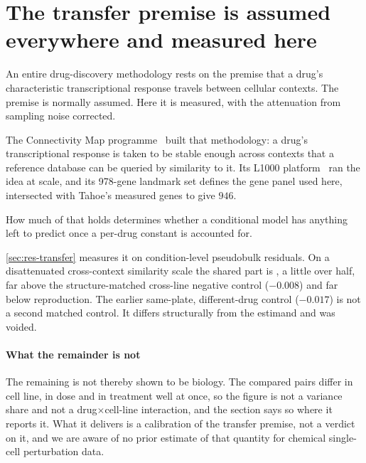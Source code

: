 \section{The transfer premise is assumed everywhere and measured here}
\label{sec:lit-cmap}
\framedecl{-}

\begin{question}
An entire drug-discovery methodology rests on the premise that a drug's
characteristic transcriptional response travels between cellular contexts. The
premise is normally assumed. Here it is measured, with the attenuation from
sampling noise corrected.
\end{question}

\noindent
The Connectivity Map programme~\cite{cmap,l1000} built that methodology: a drug's
transcriptional response is taken to be stable enough across contexts that a
reference database can be queried by similarity to it. Its L1000
platform~\cite{l1000} ran the idea at scale, and its 978-gene landmark set
defines the gene panel used here, intersected with Tahoe's measured genes to give
$946$.

How much of that holds determines whether a conditional model has anything left
to predict once a per-drug constant is accounted for.

\cref{sec:res-transfer} measures it on condition-level pseudobulk residuals. On a
disattenuated cross-context similarity scale the shared part is
, a little over half, far above the
structure-matched cross-line negative control ($-0.008$) and far below
reproduction. The earlier same-plate, different-drug control ($-0.017$) is not a
second matched control. It differs structurally from the estimand and was
voided.

\paragraph{What the remainder is not} The remaining 
is not thereby shown to be biology. The compared pairs differ in cell line, in
dose and in treatment well at once, so the figure is not a variance share and not
a drug$\times$cell-line interaction, and the section says so where it reports it.
What it delivers is a calibration of the transfer premise, not a verdict on it,
and we are aware of no prior estimate of that quantity for chemical single-cell
perturbation data.

